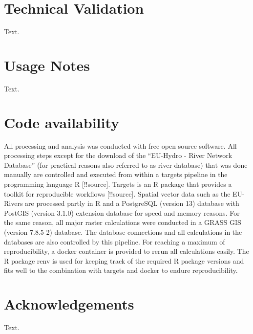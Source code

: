 \documentclass[fleqn,10pt]{wlscirep}
\begin{document}
\hypertarget{technical-validation}{%
\section*{Technical Validation}\label{technical-validation}}

Text.

\hypertarget{usage-notes}{%
\section*{Usage Notes}\label{usage-notes}}

Text.

\hypertarget{code-availability}{%
\section*{Code availability}\label{code-availability}}

All processing and analysis was conducted with free open source software. All processing steps except for the download of the ``EU-Hydro - River Network Database'' (for practical reasons also referred to as river database) that was done manually are controlled and executed from within a targets pipeline in the programming language R {[}!!source{]}. Targets is an R package that provides a toolkit for reproducible workflows {[}!!source{]}. Spatial vector data such as the EU-Rivers are processed partly in R and a PostgreSQL (version 13) database with PostGIS (version 3.1.0) extension database for speed and memory reasons. For the same reason, all major raster calculations were conducted in a GRASS GIS (version 7.8.5-2) database. The database connections and all calculations in the databases are also controlled by this pipeline. For reaching a maximum of reproducibility, a docker container is provided to rerun all calculations easily. The R package renv is used for keeping track of the required R package versions and fits well to the combination with targets and docker to endure reproducibility.

\hypertarget{acknowledgements}{%
\section*{Acknowledgements}\label{acknowledgements}}

Text.
\end{document}
